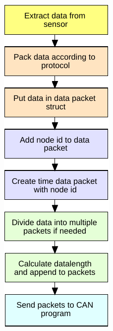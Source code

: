 \begin{figure}[!h]
    \centering
    \begin{subfigure}[b]{0.29\textwidth}
        \includegraphics[width=\textwidth]{graphics/FlowChart_Node_Packing}

\end{subfigure}
\end{figure}

